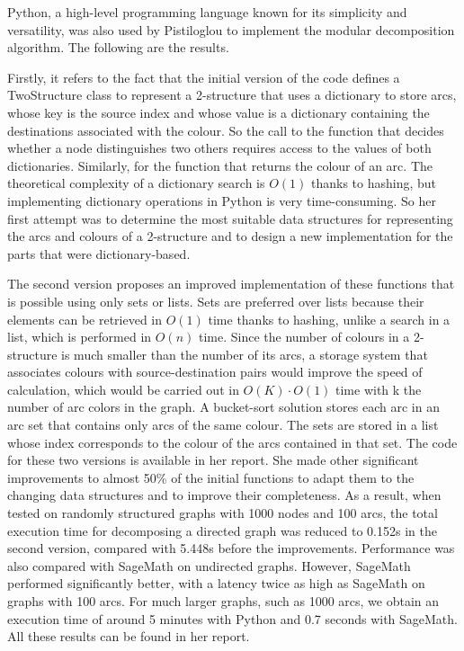 Python, a high-level programming language known for its simplicity and versatility, was also used by Pistiloglou to implement the modular decomposition algorithm.
The following are the results.

Firstly, it refers to the fact that the initial version of the code defines a TwoStructure class to represent a 2-structure that uses a dictionary to store arcs, whose key is the source index and whose value is a dictionary containing the destinations associated with the colour.
So the call to the function that decides whether a node distinguishes two others requires access to the values of both dictionaries.
Similarly, for the function that returns the colour of an arc.
The theoretical complexity of a dictionary search is $O(1)$ thanks to hashing, but implementing dictionary operations in Python is very time-consuming.
So her first attempt was to determine the most suitable data structures for representing the arcs and colours of a 2-structure and to design a new implementation for the parts that were dictionary-based.

The second version proposes an improved implementation of these functions that is possible using only sets or lists.
Sets are preferred over lists because their elements can be retrieved in $O(1)$ time thanks to hashing, unlike a search in a list, which is performed in $O(n)$ time.
Since the number of colours in a 2-structure is much smaller than the number of its arcs, a storage system that associates colours with source-destination pairs would improve the speed of calculation, which would be carried out in $O(K) \cdot O(1)$ time with k the number of arc colors in the graph.
A bucket-sort solution stores each arc in an arc set that contains only arcs of the same colour.
The sets are stored in a list whose index corresponds to the colour of the arcs contained in that set.
The code for these two versions is available in her report.
She made other significant improvements to almost 50\% of the initial functions to adapt them to the changing data structures and to improve their completeness.
As a result, when tested on randomly structured graphs with 1000 nodes and 100 arcs, the total execution time for decomposing a directed graph was reduced to 0.152s in the second version, compared with 5.448s before the improvements.
Performance was also compared with SageMath on undirected graphs.
However, SageMath performed significantly better, with a latency twice as high as SageMath on graphs with 100 arcs.
For much larger graphs, such as 1000 arcs, we obtain an execution time of around 5 minutes with Python and 0.7 seconds with SageMath.
All these results can be found in her report.


